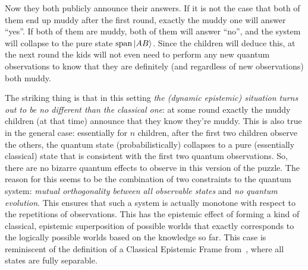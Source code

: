 \documentclass[a4paper]{article}
\DeclareMathOperator{\spn}{span}
\begin{document}
Now they both publicly announce their answers. If it is not the case that both
of them end up muddy after the first round, exactly the muddy one will
answer ``yes''. If both of them are muddy, both of them will answer ``no'', and
the system will collapse to the pure state $\spn\ket{AB}$. Since the children
will deduce this, at the next round the kids will not even need to perform any
new quantum observations to know that they are definitely (and regardless of new
observations) both muddy.

The striking thing is that in this setting \emph{the (dynamic epistemic) 
situation turns out to be no different than the classical one}: at some
round exactly the muddy children (at that time) announce that they know they're
muddy. This is also true in the general case: essentially for $n$ children, after
the first two children observe the others, the quantum state (probabilistically) 
collapses to a pure (essentially classical) state that is consistent with the
first two quantum observations. So, there are no bizarre quantum effects to
observe in this version of the puzzle. The reason for this seems to
be the combination of two constraints to the quantum system: \emph{mutual
orthogonality between all observable states} and \emph{no quantum evolution}.
This ensures that such a system is actually monotone with respect to the
repetitions of observations. This has the epistemic effect of forming a kind of
classical, epistemic superposition of possible worlds that exactly corresponds
to the logically possible worlds based on the knowledge so far. This case is
reminiscent of the definition of a Classical Epistemic Frame from~\cite{corrkn},
where all states are fully separable.
\end{document}
